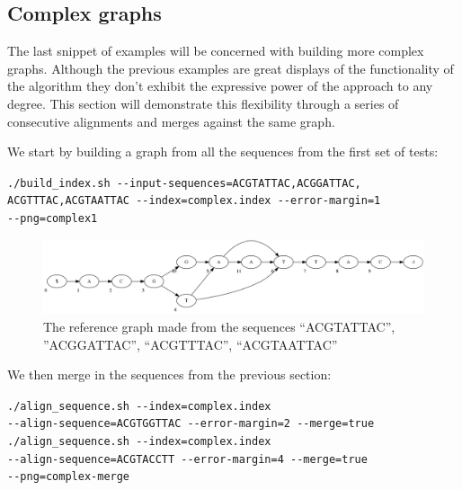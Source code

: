 \documentclass[thesis.tex]{subfiles}
\begin{document}
\subsection*{Complex graphs}
The last snippet of examples will be concerned with building more complex graphs. Although the previous examples are great displays of the functionality of the algorithm they don't exhibit the expressive power of the approach to any degree. This section will demonstrate this flexibility through a series of consecutive alignments and merges against the same graph.\\
\par\noindent
We start by building a graph from all the sequences from the first set of tests:\\
\par\noindent
\texttt{./build\_index.sh -{}-input-sequences=ACGTATTAC,ACGGATTAC,\\ACGTTTAC,ACGTAATTAC -{}-index=complex.index -{}-error-margin=1 \\-{}-png=complex1}\\
\par\noindent
\begin{figure}[H]
  \begin{mdframed}
  \includegraphics[width=\textwidth]{output/complex1.png}
  \caption{The reference graph made from the sequences ``ACGTATTAC'', ''ACGGATTAC'', ``ACGTTTAC'', ``ACGTAATTAC''}
  \label{fig:validation_complex_ref}
  \end{mdframed}
\end{figure}
\noindent
We then merge in the sequences from the previous section:\\
\par\noindent
\texttt{./align\_sequence.sh -{}-index=complex.index \\
-{}-align-sequence=ACGTGGTTAC -{}-error-margin=2 -{}-merge=true}\\
\texttt{./align\_sequence.sh -{}-index=complex.index \\
-{}-align-sequence=ACGTACCTT -{}-error-margin=4 -{}-merge=true \\
-{}-png=complex-merge}\\
\clearpage\noindent
\end{document}

